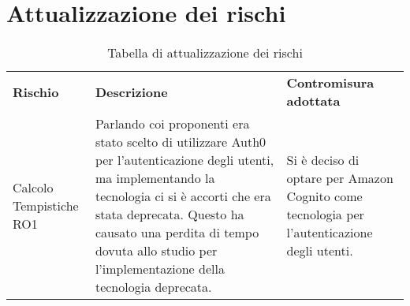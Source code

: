 \section{Attualizzazione dei rischi}
\begin{center}
    \begin{table}[h!]
        \centering
        \caption{Tabella di attualizzazione dei rischi}
        \vspace{5px}
        \renewcommand{\arraystretch}{1.8}
        \begin{tabular}{p{90px} p{150px} p{150px}}
            \rowcolor{logo!70} \textbf{Rischio} & \textbf{Descrizione}                                                                                                                                                                                                                                                                         & \textbf{Contromisura adottata}                                                              \\
            Calcolo Tempistiche RO1             & Parlando coi proponenti era stato scelto di utilizzare Auth0 per l'autenticazione degli utenti, ma implementando la tecnologia ci si è accorti che era stata deprecata. \newline Questo ha causato una perdita di tempo dovuta allo studio per l'implementazione della tecnologia deprecata. & Si è deciso di optare per Amazon Cognito come tecnologia per l'autenticazione degli utenti. \\
        \end{tabular}
    \end{table}
\end{center}
